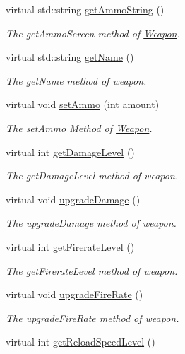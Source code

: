 \begin{DoxyCompactItemize}
virtual std\+::string \hyperlink{class_weapon_ae412d66702a05b0a0d5d6c026ee3f8d3}{get\+Ammo\+String} ()
\begin{DoxyCompactList}\small\item\em The get\+Ammo\+Screen method of \hyperlink{class_weapon}{Weapon}. \end{DoxyCompactList}\item 
virtual std\+::string \hyperlink{class_weapon_a0cc1adfac060d480dbb6d10b96de0a0d}{get\+Name} ()
\begin{DoxyCompactList}\small\item\em The get\+Name method of weapon. \end{DoxyCompactList}\item 
virtual void \hyperlink{class_weapon_a06ca67c2d2f869c6a4fc7208d4ad56b5}{set\+Ammo} (int amount)
\begin{DoxyCompactList}\small\item\em The set\+Ammo Method of \hyperlink{class_weapon}{Weapon}. \end{DoxyCompactList}\item 
virtual int \hyperlink{class_weapon_adfa7cf4006b6089d3843081cfd46aaf2}{get\+Damage\+Level} ()
\begin{DoxyCompactList}\small\item\em The get\+Damage\+Level method of weapon. \end{DoxyCompactList}\item 
virtual void \hyperlink{class_weapon_a9419b6f263f0b78e0665678c9a14973a}{upgrade\+Damage} ()
\begin{DoxyCompactList}\small\item\em The upgrade\+Damage method of weapon. \end{DoxyCompactList}\item 
virtual int \hyperlink{class_weapon_a5ada13535926ce1445b8205f91085c39}{get\+Firerate\+Level} ()
\begin{DoxyCompactList}\small\item\em The get\+Firerate\+Level method of weapon. \end{DoxyCompactList}\item 
virtual void \hyperlink{class_weapon_aedc0a69ed6da65caf70e8ff2d81b1271}{upgrade\+Fire\+Rate} ()
\begin{DoxyCompactList}\small\item\em The upgrade\+Fire\+Rate method of weapon. \end{DoxyCompactList}\item 
virtual int \hyperlink{class_weapon_a188f89050bfb1b8ba94d5c6cb1527496}{get\+Reload\+Speed\+Level} ()

\end{DoxyCompactItemize}
